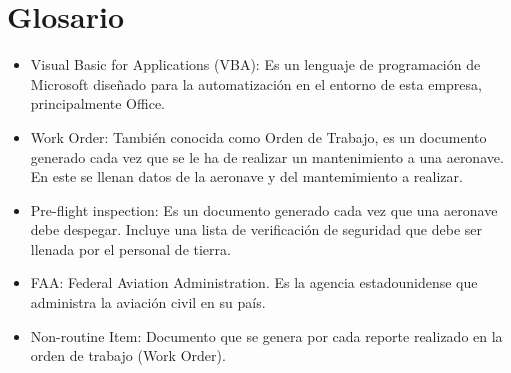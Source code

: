 \section{Glosario}
\begin{itemize}
    \item Visual Basic for Applications (VBA): Es un lenguaje de programación de Microsoft diseñado para la automatización en el entorno de esta empresa, principalmente Office.
    \item Work Order: También conocida como Orden de Trabajo, es un documento generado cada vez que se le ha de realizar un mantenimiento a una aeronave. En este se llenan datos de la aeronave y del mantemimiento a realizar.
    \item Pre-flight inspection: Es un documento generado cada vez que una aeronave debe despegar. Incluye una lista de verificación de seguridad que debe ser llenada por el personal de tierra.
    \item FAA: Federal Aviation Administration. Es la agencia estadounidense que administra la aviación civil en su país.
    \item Non-routine Item: Documento que se genera por cada reporte realizado en la orden de trabajo (Work Order).
    
\end{itemize}